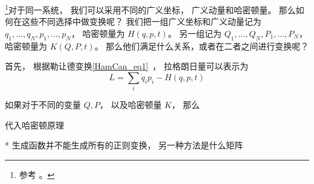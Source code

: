 \footnote{参考 \cite{Goldstein}。}对于同一系统， 我们可以采用不同的广义坐标， 广义动量和哈密顿量。 那么如何在这些不同选择中做变换呢？ 我们把一组广义坐标和广义动量记为 $q_1,\dots, q_N, p_1, \dots, p_N$， 哈密顿量为 $H(q, p, t)$。 另一组记为 $Q_1,\dots, Q_N, P_1, \dots, P_N$， 哈密顿量为 $K(Q, P, t)$。 那么他们满足什么关系，或者在二者之间进行变换呢？

首先， 根据勒让德变换\autoref{HamCan_eq1}~， 拉格朗日量可以表示为
\begin{equation}
L = \sum_i \dot q_i p_i - H(q, p, t)
\end{equation}

如果对于不同的变量 $Q, P$， 以及哈密顿量 $K$， 那么

代入哈密顿原理

* 生成函数并不能生成所有的正则变换， 另一种方法是什么矩阵
